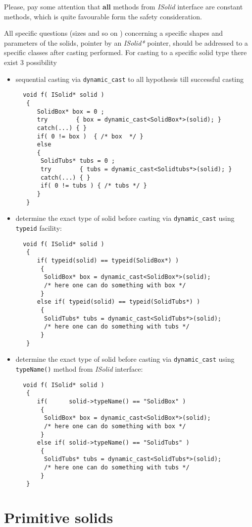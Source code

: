 Please, pay some attention that {\bf all} methods from {\it ISolid} interface 
are constant methods, which is quite favourable form the safety consideration. 

All specific questions (sizes and so on ) concerning a 
specific shapes and parameters of the solids, pointer by an 
{\it  ISolid* } pointer, should be addressed to a 
specific classes after casting performed. 
For casting to a specific solid type there exist 3 possibility 
\begin{itemize}
\item sequential casting via  \verb+dynamic_cast+ to all hypothesis till successful casting
  \begin{verbatim}
  void f( ISolid* solid ) 
   {
      SolidBox* box = 0 ;
      try        { box = dynamic_cast<SolidBox*>(solid); } 
      catch(...) { }  
      if( 0 != box )  { /* box  */ }
      else
      { 
       SolidTubs* tubs = 0 ;
       try        { tubs = dynamic_cast<Solidtubs*>(solid); } 
       catch(...) { }  
       if( 0 != tubs ) { /* tubs */ } 
      }
   } 
  \end{verbatim} 
\item determine the exact type of solid before casting via \verb+dynamic_cast+
using \verb+typeid+ facility:
\begin{verbatim}
  void f( ISolid* solid ) 
   {
      if( typeid(solid) == typeid(SolidBox*) ) 
       { 
        SolidBox* box = dynamic_cast<SolidBox*>(solid); 
        /* here one can do something with box */
       } 
      else if( typeid(solid) == typeid(SolidTubs*) ) 
       { 
        SolidTubs* tubs = dynamic_cast<SolidTubs*>(solid); 
        /* here one can do something with tubs */
       } 
   }
\end{verbatim}
\item determine the exact type of solid before casting via \verb+dynamic_cast+
using \verb+typeName()+ method from {\it ISolid} interface:
\begin{verbatim}
  void f( ISolid* solid ) 
   {
      if(      solid->typeName() == "SolidBox" ) 
       { 
        SolidBox* box = dynamic_cast<SolidBox*>(solid); 
        /* here one can do something with box */
       } 
      else if( solid->typeName() == "SolidTubs" ) 
       { 
        SolidTubs* tubs = dynamic_cast<SolidTubs*>(solid); 
        /* here one can do something with tubs */
       } 
   }
\end{verbatim}
\end{itemize}

 \section{ Primitive solids } 
	
